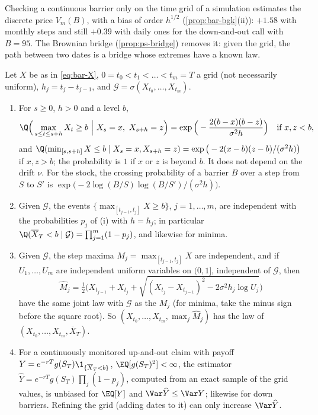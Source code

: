 Checking a continuous barrier only on the time grid of a simulation estimates the discrete price
$V_m(B)$, with a bias of order $h^{1/2}$ (\cref{prop:bar-bgk}(ii)): $+1.58$ with monthly steps and still
$+0.39$ with daily ones for the down-and-out call with $B=95$. The Brownian bridge
(\cref{prop:ps-bridge}) removes it: given the grid, the path between two dates is a bridge whose
extremes have a known law.

\begin{proposition}\label{prop:bar-bridge-crossing}
Let $X$ be as in \eqref{eq:bar-X}, $0=t_0<t_1<\dots<t_m=T$ a grid (not necessarily uniform),
$h_j=t_j-t_{j-1}$, and $\mathcal G=\sigma(X_{t_0},\dots,X_{t_m})$.
\begin{enumerate}[label=(\roman*)]
  \item For $s\ge0$, $h>0$ and a level $b$,
    \[
      \Q\Big(\max_{s\le t\le s+h}X_t\ge b\ \Big|\ X_s=x,\ X_{s+h}=z\Big)=\exp\Big(-\frac{2(b-x)(b-z)}{\sigma^2h}\Big)
      \quad\text{if }x,z<b,
    \]
    and $\Q(\min_{[s,s+h]}X\le b\mid X_s=x,X_{s+h}=z)=\exp\big(-2(x-b)(z-b)/(\sigma^2h)\big)$ if $x,z>b$; the
    probability is $1$ if $x$ or $z$ is beyond $b$. It does not depend on the drift $\nu$. For the
    stock, the crossing probability of a barrier $B$ over a step from $S$ to $S'$ is
    $\exp\big(-2\log(B/S)\log(B/S')/(\sigma^2h)\big)$.
  \item Given $\mathcal G$, the events $\{\max_{[t_{j-1},t_j]}X\ge b\}$, $j=1,\dots,m$, are
    independent with the probabilities $p_j$ of (i) with $h=h_j$; in particular
    $\Q(\overline X_T<b\mid\mathcal G)=\prod_{j=1}^m(1-p_j)$, and likewise for minima.
  \item Given $\mathcal G$, the step maxima $M_j=\max_{[t_{j-1},t_j]}X$ are independent, and if
    $U_1,\dots,U_m$ are independent uniform variables on $(0,1]$, independent of $\mathcal G$, then
    \[
      \widehat M_j=\tfrac12\Big(X_{t_{j-1}}+X_{t_j}+\sqrt{(X_{t_j}-X_{t_{j-1}})^2-2\sigma^2h_j\log U_j}\Big)
    \]
    have the same joint law with $\mathcal G$ as the $M_j$ (for minima, take the minus sign before
    the square root). So $(X_{t_0},\dots,X_{t_m},\max_j\widehat M_j)$ has the law of
    $(X_{t_0},\dots,X_{t_m},\overline X_T)$.
  \item For a continuously monitored up-and-out claim with payoff $Y=e^{-rT}g(S_T)\1_{\{\overline X_T<b\}}$,
    $\EQ[g(S_T)^2]<\infty$, the estimator $\widehat Y=e^{-rT}g(S_T)\prod_j(1-p_j)$, computed from an exact
    sample of the grid values, is unbiased for $\EQ[Y]$ and $\Var\widehat Y\le\Var Y$; likewise for
    down barriers. Refining the grid
    (adding dates to it) can only increase $\Var\widehat Y$.
\end{enumerate}
\end{proposition}

